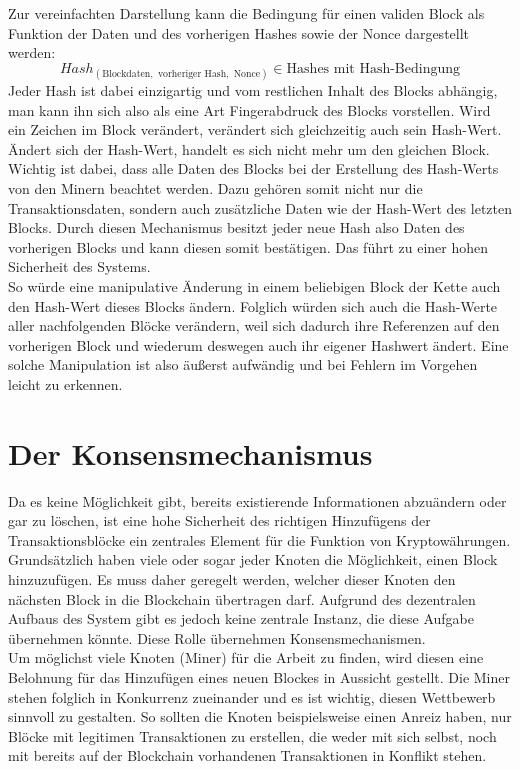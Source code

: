 \documentclass[12pt]{article}
\begin{document}
Zur vereinfachten Darstellung kann die Bedingung für einen validen Block als Funktion der Daten und des vorherigen Hashes sowie der Nonce dargestellt werden:
\[Hash_{(\text{Blockdaten}, \text{ vorheriger Hash}, \text{ Nonce})}\in \text{Hashes mit Hash-Bedingung}\]
Jeder Hash ist dabei einzigartig und vom restlichen Inhalt des Blocks abhängig, man kann ihn sich also als eine Art Fingerabdruck des Blocks vorstellen. Wird ein Zeichen im Block verändert, verändert sich gleichzeitig auch sein Hash-Wert. Ändert sich der Hash-Wert, handelt es sich nicht mehr um den gleichen Block. Wichtig ist dabei, dass alle Daten des Blocks bei der Erstellung des Hash-Werts von den Minern beachtet werden. Dazu gehören somit nicht nur die Transaktionsdaten, sondern auch zusätzliche Daten wie der Hash-Wert des letzten Blocks. Durch diesen Mechanismus besitzt jeder neue Hash also Daten des vorherigen Blocks und kann diesen somit bestätigen. Das führt zu einer hohen Sicherheit des Systems.\\
So würde eine manipulative Änderung in einem beliebigen Block der Kette auch den Hash-Wert dieses Blocks ändern. Folglich würden sich auch die Hash-Werte aller nachfolgenden Blöcke verändern, weil sich dadurch ihre Referenzen auf den vorherigen Block und wiederum deswegen auch ihr eigener Hashwert ändert. Eine solche Manipulation ist also äußerst aufwändig und bei Fehlern im Vorgehen leicht zu erkennen.

\section{Der Konsensmechanismus}
Da es keine Möglichkeit gibt, bereits existierende Informationen abzuändern oder gar zu löschen, ist eine hohe Sicherheit des richtigen Hinzufügens der Transaktionsblöcke ein zentrales Element für die Funktion von Kryptowährungen. Grundsätzlich haben viele oder sogar jeder Knoten die Möglichkeit, einen Block hinzuzufügen. Es muss daher geregelt werden, welcher dieser Knoten den nächsten Block in die Blockchain übertragen darf. Aufgrund des dezentralen Aufbaus des System gibt es jedoch keine zentrale Instanz, die diese Aufgabe übernehmen könnte. Diese Rolle übernehmen Konsensmechanismen.\\
Um möglichst viele Knoten (Miner) für die Arbeit zu finden, wird diesen eine Belohnung für das Hinzufügen eines neuen Blockes in Aussicht gestellt. Die Miner stehen folglich in Konkurrenz zueinander und es ist wichtig, diesen Wettbewerb sinnvoll zu gestalten. So sollten die Knoten beispielsweise einen Anreiz haben, nur Blöcke mit legitimen Transaktionen zu erstellen, die weder mit sich selbst, noch mit bereits auf der Blockchain vorhandenen Transaktionen in Konflikt stehen.
\end{document}
